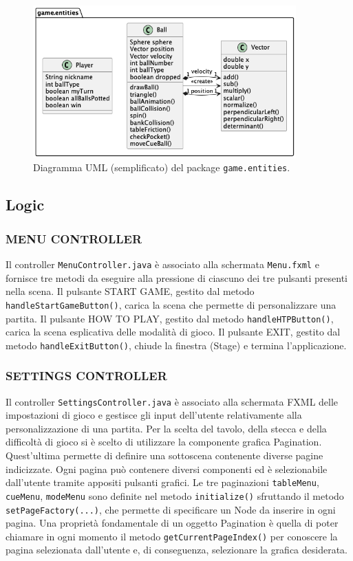 \documentclass[12pt,a4paper]{report}
\begin{document}
\begin{figure}
	\center
	\includegraphics[width=0.9\textwidth]{entities.png}
	\caption{Diagramma UML (semplificato) del package \texttt{game.entities}.}
\end{figure}

\subsection{Logic} \label{se:Logic} %

\subsubsection*{MENU CONTROLLER}
Il controller \texttt{MenuController.java} è associato alla schermata \texttt{Menu.fxml} e fornisce tre metodi da eseguire alla pressione di ciascuno dei tre pulsanti presenti nella scena.
Il pulsante START GAME, gestito dal metodo \texttt{handleStartGameButton()}, carica la scena che permette di personalizzare una partita.
Il pulsante HOW TO PLAY, gestito dal metodo \texttt{handleHTPButton()}, carica la scena esplicativa delle modalità di gioco.
Il pulsante EXIT, gestito dal metodo \texttt{handleExitButton()}, chiude la finestra (Stage) e termina l'applicazione.

\subsubsection*{SETTINGS CONTROLLER}
Il controller \texttt{SettingsController.java} è associato alla schermata FXML delle impostazioni di gioco e gestisce gli input dell'utente relativamente alla personalizzazione di una partita.
Per la scelta del tavolo, della stecca e della difficoltà di gioco si è scelto di utilizzare la componente grafica Pagination.
Quest'ultima permette di definire una sottoscena contenente diverse pagine indicizzate.
Ogni pagina può contenere diversi componenti ed è selezionabile dall'utente tramite appositi pulsanti grafici.
Le tre paginazioni \texttt{tableMenu}, \texttt{cueMenu}, \texttt{modeMenu} sono definite nel metodo \texttt{initialize()} sfruttando il metodo \texttt{setPageFactory(...)}, che permette di specificare un Node da inserire in ogni pagina.
Una proprietà fondamentale di un oggetto Pagination è quella di poter chiamare in ogni momento il metodo \texttt{getCurrentPageIndex()} per conoscere la pagina selezionata dall'utente e, di conseguenza, selezionare la grafica desiderata.
\end{document}
